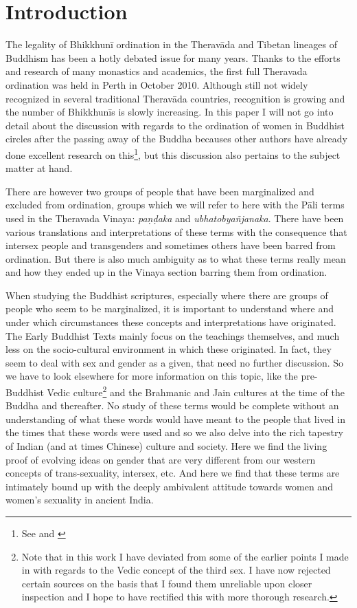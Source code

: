 \section{Introduction}
The legality of Bhikkhunī ordination in the Theravāda and Tibetan lineages of Buddhism has been a hotly debated issue for many years. Thanks to the efforts and research of many monastics and academics, the first full Theravada ordination was held in Perth in October 2010. Although still not widely recognized in several traditional Theravāda countries, recognition is growing and the number of Bhikkhunīs is slowly increasing. In this paper I will not go into detail about the discussion with regards to the ordination of women in Buddhist circles after the passing away of the Buddha becauses other authors have already done excellent research on this\footnote{See \cite{sujato2009} and \cite{analayo2013}}, but this discussion also pertains to the subject matter at hand.

There are however two groups of people that have been marginalized and excluded from ordination, groups which we will refer to here with the Pāli terms used in the Theravada Vinaya: {\em paṇḍaka} and {\em ubhatob­yañ­janaka}. There have been various translations and interpretations of these terms with the consequence that intersex people and transgenders and sometimes others have been barred from ordination. But there is also much ambiguity as to what these terms really mean and how they ended up in the Vinaya section barring them from ordination.

When studying the Buddhist scriptures, especially where there are groups of people who seem to be marginalized, it is important to understand where and under which circumstances these concepts and interpretations have originated. The Early Buddhist Texts mainly focus on the teachings themselves, and much less on the socio-cultural environment in which these originated. In fact, they seem to deal with sex and gender as a given, that need no further discussion. So we have to look elsewhere for more information on this topic, like the pre-Buddhist Vedic culture\footnote{Note that in this work I have deviated from some of the earlier points I made in \cite{vimala} with regards to the Vedic concept of the third sex. I have now rejected certain sources on the basis that I found them unreliable upon closer inspection and I hope to have rectified this with more thorough research.} and the Brahmanic and Jain cultures at the time of the Buddha and thereafter. No study of these terms would be complete without an understanding of what these words would have meant to the people that lived in the times that these words were used and so we also delve into the rich tapestry of Indian (and at times Chinese) culture and society. Here we find the living proof of evolving ideas on gender that are very different from our western concepts of trans-sexuality, intersex, etc. And here we find that these terms are intimately bound up with the deeply ambivalent attitude towards women and women's sexuality in ancient India.

